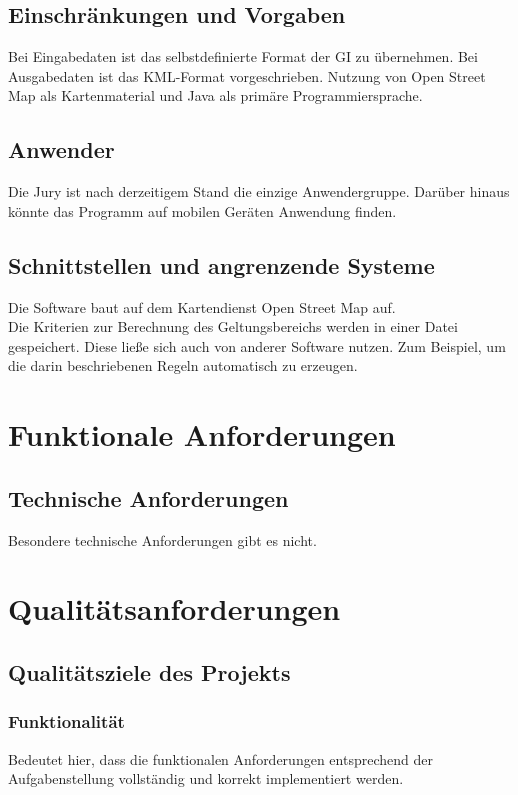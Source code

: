\subsection{Einschränkungen und Vorgaben}
Bei Eingabedaten ist das selbstdefinierte Format der GI zu übernehmen. Bei Ausgabedaten ist das KML-Format vorgeschrieben.
Nutzung von Open Street Map als Kartenmaterial und Java als primäre Programmiersprache.
\subsection{Anwender}
Die Jury ist nach derzeitigem Stand die einzige Anwendergruppe. Darüber hinaus könnte das Programm auf mobilen Geräten Anwendung finden.
\subsection{Schnittstellen und angrenzende Systeme}
Die Software baut auf dem Kartendienst Open Street Map auf.\\
Die Kriterien zur Berechnung des Geltungsbereichs werden in einer Datei gespeichert. Diese ließe sich auch von anderer Software nutzen.
Zum Beispiel, um die darin beschriebenen Regeln automatisch zu erzeugen.
\section{Funktionale Anforderungen}
\subsection{Technische Anforderungen}
Besondere technische Anforderungen gibt es nicht.\\


\section{Qualitätsanforderungen}
\subsection{Qualitätsziele des Projekts}
\subsubsection{Funktionalität}
Bedeutet hier, dass die funktionalen Anforderungen entsprechend der Aufgabenstellung vollständig und korrekt implementiert werden.

